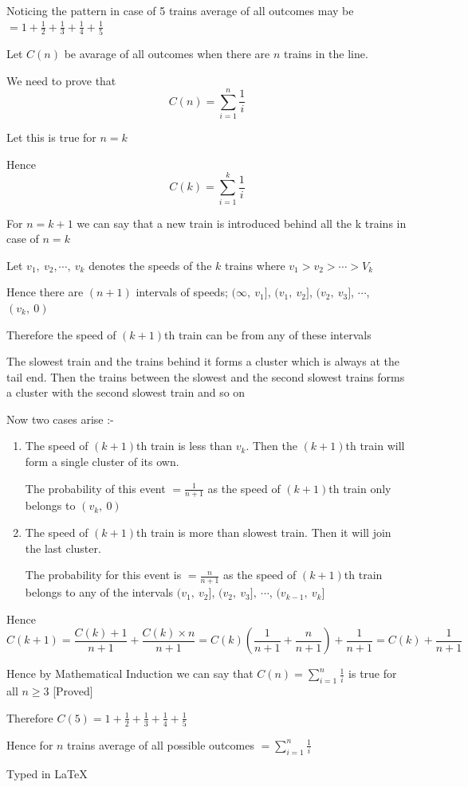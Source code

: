 \documentclass{article}
\begin{document}
\begin{enumerate}
Noticing the pattern in case of 5 trains average of all outcomes may be $=\displaystyle{1+\frac{1}{2}+\frac{1}{3}+\frac{1}{4}+\frac{1}{5}}$
\bigskip

\bigskip

Let $C(n)$ be avarage of all outcomes when there are $n$ trains in the line. 

We need to prove that $$C(n)=\sum \limits_{i=1}^n \frac{1}{i}$$

Let this is true for $n=k$

Hence $$C(k)=\sum \limits_{i=1}^k \frac{1}{i}$$

For $n=k+1$ we can say that a new train is introduced behind all the k trains in case of $n=k$

Let $v_1,\ v_2,\cdots,\ v_k$ denotes the speeds of the $k$ trains where $v_1>v_2>\cdots >V_k$

Hence there are $(n+1)$ intervals of speeds; $(\infty,\ v_1]$,  $(v_1,\ v_2]$,  $(v_2,\ v_3]$, $\cdots$,  $(v_k,\ 0)$ 

Therefore the speed of $(k+1)$th train can be from any of these intervals 

The slowest train and the trains behind it forms a cluster which is always at the tail end. Then  the trains between the slowest and the second slowest  trains forms a cluster with the second slowest train and so on

Now two cases arise :-
  \begin{enumerate}
      \item The speed of $(k+1)$th train is less than $v_k$. Then  the $(k+1)$th train will form a single cluster of its own. 
      
      The probability of this event $=\displaystyle{\frac{1}{n+1}}$ as the speed of $(k+1)$th train only belongs to $(v_k,\ 0)$
      \item The speed of $(k+1)$th train is more than slowest train. Then it will join the last cluster.
      
      The probability for this event is $=\displaystyle{\frac{n}{n+1}}$ as the speed of $(k+1)$th train belongs to any of the intervals $(v_1,\ v_2]$, $(v_2,\ v_3],\ \cdots$, $(v_{k-1},\ v_k]$
      \end{enumerate}
      
Hence $$C(k+1)= \frac{C(k)+1}{n+1}+\frac{C(k)\times n}{n+1}=C(k)\left(\frac{1}{n+1}+\frac{n}{n+1} \right)+\frac{1}{n+1}=C(k)+\frac{1}{n+1}$$

Hence by Mathematical Induction we can say that $C(n)=\displaystyle{\sum \limits_{i=1}^n \frac{1}{i}}$ is true for all $n\geq3$ [Proved]

Therefore $C(5)=\displaystyle{1+\frac{1}{2}+\frac{1}{3}+\frac{1}{4}+\frac{1}{5}}$
  
Hence for $n$ trains average of all possible outcomes  $=\displaystyle{\sum \limits_{i=1}^n \frac{1}{i}}$


\begin{flushright}
\vspace*{\fill}
Typed in \LaTeX
\end{flushright}






\end{enumerate}
\end{document}
